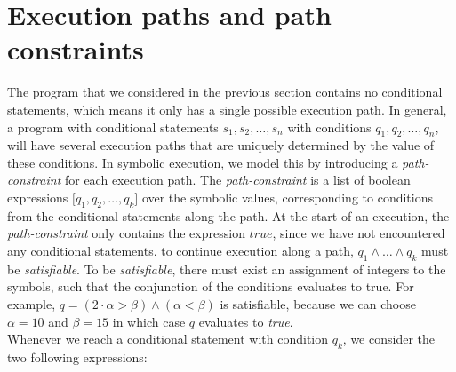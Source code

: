 \section{Execution paths and path constraints}
		The program that we considered in the previous section contains no conditional statements, which means it only has a single possible execution path. In general, a program with conditional statements $s_1, s_2, \ldots, s_n$ with conditions $q_1, q_2, \ldots, q_n$, will have several execution paths that are uniquely determined by the value of these conditions. In symbolic execution, we model this by introducing a \emph{path-constraint} for each execution path. The \emph{path-constraint} is a list of boolean expressions $\lbrack q_1, q_2, \ldots, q_k \rbrack$ over the symbolic values, corresponding to conditions from the conditional statements along the path. At the start of an execution, the \emph{path-constraint} only contains the expression $true$, since we have not encountered any conditional statements. to continue execution along a path, $q_1 \land \ldots \land q_k$ must be \emph{satisfiable}. To be \emph{satisfiable}, there must exist an assignment of integers to the symbols, such that the conjunction of the conditions evaluates to true. For example, $q = (2\cdot \alpha > \beta) \land (\alpha < \beta)$ is satisfiable, because we can choose $\alpha = 10$ and $\beta = 15$ in which case $q$ evaluates to \emph{true}.
		\\ 
		Whenever we reach a conditional statement with condition $q_k$, we consider the two following expressions:
		

